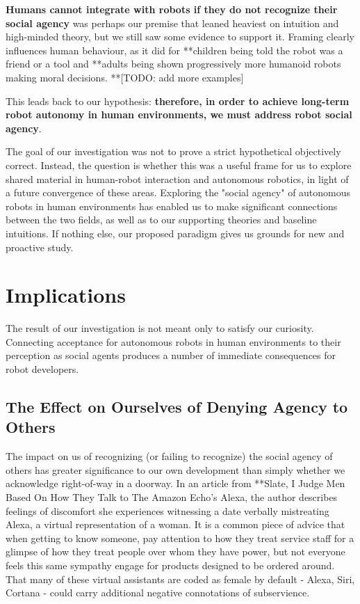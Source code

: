 \documentclass{sfuthesis}
\begin{document}
\textbf{Humans cannot integrate with robots if they do not recognize their social agency} was perhaps our premise that leaned heaviest on intuition and high-minded theory, but we still saw some evidence to support it. Framing clearly influences human behaviour, as it did for **children being told the robot was a friend or a tool and **adults being shown progressively more humanoid robots making moral decisions. **[TODO: add more examples]

This leads back to our hypothesis: \textbf{therefore, in order to achieve long-term robot autonomy in human environments, we must address robot social agency}.

The goal of our investigation was not to prove a strict hypothetical objectively correct. Instead, the question is whether this was a useful frame for us to explore shared material in human-robot interaction and autonomous robotics, in light of a future convergence of these areas. Exploring the "social agency" of autonomous robots in human environments has enabled us to make significant connections between the two fields, as well as to our supporting theories and baseline intuitions. If nothing else, our proposed paradigm gives us grounds for new and proactive study.

\section{Implications}

The result of our investigation is not meant only to satisfy our curiosity. Connecting acceptance for autonomous robots in human environments to their perception as social agents produces a number of immediate consequences for robot developers. 

\subsection{The Effect on Ourselves of Denying Agency to Others}

The impact on us of recognizing (or failing to recognize) the social agency of others has greater significance to our own development than simply whether we acknowledge right-of-way in a doorway. In an article from **Slate, I Judge Men Based On How They Talk to The Amazon Echo's Alexa, the author describes feelings of discomfort she experiences witnessing a date verbally mistreating Alexa, a virtual representation of a woman. It is a common piece of advice that when getting to know someone, pay attention to how they treat service staff for a glimpse of how they treat people over whom they have power, but not everyone feels this same sympathy engage for products designed to be ordered around. That many of these virtual assistants are coded as female by default - Alexa, Siri, Cortana - could carry additional negative connotations of subservience.
\end{document}
